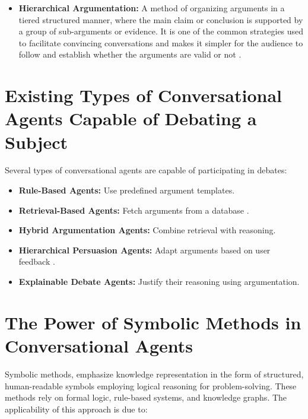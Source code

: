 \documentclass[conference]{IEEEtran}
\begin{document}
\begin{itemize}
    \item \textbf{Hierarchical Argumentation:} A method of organizing arguments in a tiered structured manner, where the main claim or conclusion is supported by a group of sub-arguments or evidence. It is one of the common strategies used to facilitate convincing conversations and makes it simpler for the audience to follow and establish whether the arguments are valid or not  \cite{b5}.
\end{itemize}

\section{Existing Types of Conversational Agents Capable of Debating a Subject}
Several types of conversational agents are capable of participating in debates:

\begin{itemize}
    \item \textbf{Rule-Based Agents:} Use predefined argument templates.
    \item \textbf{Retrieval-Based Agents:} Fetch arguments from a database \cite{b3}.
    \item \textbf{Hybrid Argumentation Agents:} Combine retrieval with reasoning.
    \item \textbf{Hierarchical Persuasion Agents:} Adapt arguments based on user feedback \cite{b5}.
    \item \textbf{Explainable Debate Agents:} Justify their reasoning using argumentation.
\end{itemize}


\section{The Power of Symbolic Methods in Conversational Agents}
Symbolic methods, emphasize knowledge representation in the form of structured, human-readable symbols employing logical reasoning for problem-solving. These methods rely on formal logic, rule-based systems, and knowledge graphs. The applicability of this approach is due to:
\end{document}
